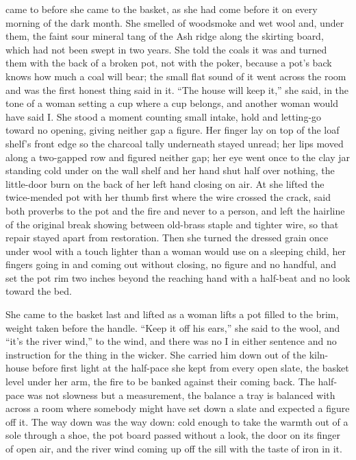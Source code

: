  came to  before she came to the basket, as she had come before it on every morning of the dark month. She smelled of woodsmoke and wet wool and, under them, the faint sour mineral tang of the Ash ridge along the skirting board, which had not been swept in two years. She told the coals it was  and turned them with the back of a broken pot, not with the poker, because a pot's back knows how much a coal will bear; the small flat sound of it went across the room and was the first honest thing said in it. “The house will keep it,” she said, in the tone of a woman setting a cup where a cup belongs, and another woman would have said I. She stood a moment counting small intake, hold and letting-go toward no opening, giving neither gap a figure. Her finger lay on top of the loaf shelf's front edge so the charcoal tally underneath stayed unread; her lips moved along a two-gapped row and figured neither gap; her eye went once to the clay jar standing cold under  on the wall shelf and her hand shut half over nothing, the little-door burn on the back of her left hand closing on air. At  she lifted the twice-mended pot with her thumb first where the wire crossed the crack, said both proverbs to the pot and the fire and never to a person, and left the hairline of the original break showing between old-brass staple and tighter wire, so that repair stayed apart from restoration. Then she turned the dressed grain once under wool with a touch lighter than a woman would use on a sleeping child, her fingers going in and coming out without closing, no figure and no handful, and set the pot rim two inches beyond the reaching hand with a half-beat and no look toward the bed.

She came to the basket last and lifted as a woman lifts a pot filled to the brim, weight taken before the handle. “Keep it off his ears,” she said to the wool, and “it's the river wind,” to the wind, and there was no I in either sentence and no instruction for the thing in the wicker. She carried him down out of the kiln-house before first light at the half-pace she kept from every open slate, the basket level under her arm, the fire to be banked against their coming back. The half-pace was not slowness but a measurement, the balance a tray is balanced with across a room where somebody might have set down a slate and expected a figure off it. The way down was the way down:  cold enough to take the warmth out of a sole through a shoe, the pot board passed without a look, the door on its finger of open air, and the river wind coming up off the sill with the taste of iron in it.

